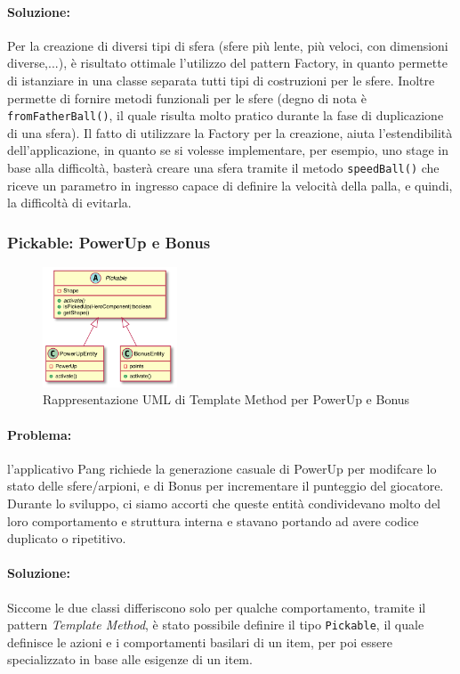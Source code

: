 \documentclass[a4paper,12pt]{report}
\begin{document}
\paragraph{Soluzione:} Per la creazione di diversi tipi di sfera (sfere più lente, più veloci, con dimensioni diverse,...), è risultato ottimale l'utilizzo del pattern Factory, in quanto permette di istanziare in una classe separata tutti tipi di costruzioni per le sfere. Inoltre permette di fornire metodi funzionali per le sfere (degno di nota è \texttt{fromFatherBall()}, il quale risulta molto pratico durante la fase di duplicazione di una sfera). Il fatto di utilizzare la Factory per la creazione, aiuta l'estendibilità dell'applicazione, in quanto se si volesse implementare, per esempio, uno stage in base alla difficoltà, basterà creare una sfera tramite il metodo \texttt{speedBall()} che riceve un parametro in ingresso capace di definire la velocità della palla, e quindi, la difficoltà di evitarla.



\subsubsection{Pickable: PowerUp e Bonus}
\begin{figure}[H]
\centering{}
\includegraphics[width=4cm]{img/Pickable.png}
\caption{Rappresentazione UML di Template Method per PowerUp e Bonus}
\label{img:pickable}
\end{figure}

\paragraph{Problema:} l'applicativo Pang richiede la generazione casuale di PowerUp per modifcare lo stato delle sfere/arpioni, e di Bonus per incrementare il punteggio del giocatore.
Durante lo sviluppo, ci siamo accorti che queste entità condividevano molto del loro comportamento e struttura interna e stavano portando ad avere codice duplicato o ripetitivo.

\paragraph{Soluzione:} Siccome le due classi differiscono solo per qualche comportamento, tramite il pattern \emph{Template Method}, è stato possibile definire il tipo \texttt{Pickable}, il quale definisce le azioni e i comportamenti basilari di un item, per poi essere specializzato in base alle esigenze di un item.
\end{document}
